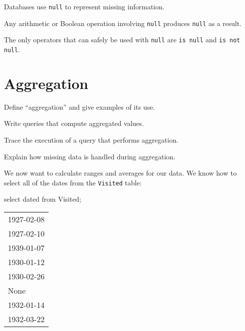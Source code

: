 \documentclass{book}
\begin{document}
\begin{keypoints}
\begin{swcitemize}
\item
  Databases use \texttt{null} to represent missing information.
\item
  Any arithmetic or Boolean operation involving \texttt{null} produces
  \texttt{null} as a result.
\item
  The only operators that can safely be used with \texttt{null} are
  \texttt{is null} and \texttt{is not null}.
\end{swcitemize}
\end{keypoints}

\section{Aggregation}

\begin{objectives}
\begin{swcitemize}
\item
  Define ``aggregation'' and give examples of its use.
\item
  Write queries that compute aggregated values.
\item
  Trace the execution of a query that performs aggregation.
\item
  Explain how missing data is handled during aggregation.
\end{swcitemize}
\end{objectives}

We now want to calculate ranges and averages for our data. We know how
to select all of the dates from the \texttt{Visited} table:

\begin{VerbIn}
\end{VerbIn}

\begin{VerbIn}
select dated from Visited;
\end{VerbIn}

\begin{tabular}{l}
1927-02-08 \\
1927-02-10 \\
1939-01-07 \\
1930-01-12 \\
1930-02-26 \\
None \\
1932-01-14 \\
1932-03-22 \\
\end{tabular}
\end{document}

